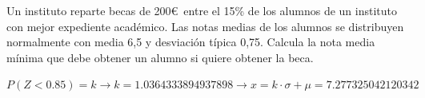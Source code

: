 \documentclass[addpoints,spanish, 12pt,a4paper]{exam}
\begin{document}
\begin{questions}

        
\question[2] Un instituto reparte becas de 200\euro  \  entre el 15\% de los alumnos de un instituto con mejor expediente académico. Las notas medias de los alumnos se distribuyen normalmente con media 6,5 y desviación típica 0,75. Calcula la nota media mínima que debe obtener un alumno si quiere obtener la beca.
\begin{solution}
$P(Z<0.85)=k \to k=1.0364333894937898 \to x=k\cdot \sigma + \mu = 7.277325042120342$
\end{solution}


\addpoints




\end{questions}
\end{document}
